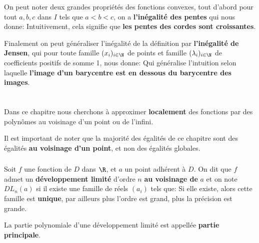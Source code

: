 On peut noter deux grandes propriétés des fonctions convexes, tout d'abord pour tout \(a, b, c\) dans \(I\) tels que \(a < b < c\), on a \textbf{l'inégalité des pentes} qui nous donne:
Intuitivement, cela signifie que \textbf{les pentes des cordes sont croissantes}.\<

Finalement on peut généraliser l'inégalité de la définition par \textbf{l'inégalité de Jensen}, qui pour toute famille \((x_i)_{i \in \N}\) de points et famille \((\lambda_i)_{i \in \N}\) de coefficients positifs de somme 1, nous donne:
Qui généralise l'intuition selon laquelle \textbf{l'image d'un barycentre est en dessous du barycentre des images}.
\chapter*{} %

Dans ce chapitre nous cherchons à approximer \textbf{localement} des fonctions par des polynômes au voisinage d'un point ou de l'infini.\<

Il est important de noter que la majorité des égalités de ce chapitre sont des égalités \textbf{au voisinage d'un point}, et non des égalités globales.
\subsection*{}

Soit \(f\) une fonction de \(D\) dans \(\R\), et \(a\) un point adhérent à \(D\). On dit que \(f\) admet un \textbf{développement limité} d'ordre \(n\) \textbf{au voisinage de } \(a\) et on note \(DL_n(a)\) si il existe une famille de réels \((a_i)\) tels que:
Si elle existe, alors cette famille est \textbf{unique}, par ailleurs plus l'ordre est grand, plus la précision est grande.\+

La partie polynomiale d'une développement limité est appellée \textbf{partie principale}.

\subsection*{}

